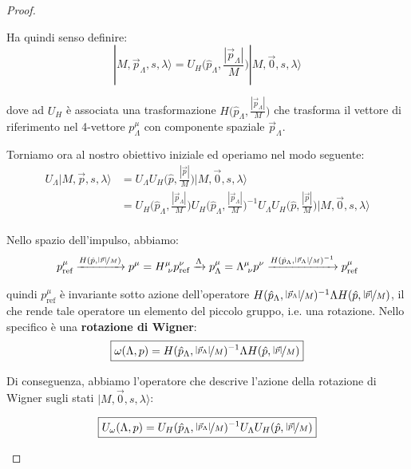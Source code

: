 \documentclass[../main.tex]{subfiles}
\begin{document}
\begin{proof}
\begin{itemize}
    Ha quindi senso definire: \[|M,\Vec{p}_\Lambda,s,\lambda\rangle = U_H\Big(\hat{p}_\Lambda, \frac{|\Vec{p}_\Lambda|}{M}\Big)|M,\Vec{0},s,\lambda\rangle\]

    dove ad $U_H$ è associata una trasformazione $H\big(\hat{p}_\Lambda, \frac{|\Vec{p}_\Lambda|}{M}\big)$ che trasforma il vettore di riferimento nel 4-vettore $p_\Lambda^\mu$ con componente spaziale $\Vec{p}_\Lambda$.

    Torniamo ora al nostro obiettivo iniziale ed operiamo nel modo seguente:
    \begin{align*}
        U_\Lambda|M,\Vec{p},s,\lambda\rangle &= U_\Lambda U_H\Big(\hat{p}, \frac{|\Vec{p}|}{M}\Big)|M,\Vec{0},s,\lambda\rangle \\
        &= U_H\Big(\hat{p}_\Lambda, \frac{|\Vec{p}_\Lambda|}{M}\Big)U_H\Big(\hat{p}_\Lambda, \frac{|\Vec{p}_\Lambda|}{M}\Big)^{-1}U_\Lambda U_H\Big(\hat{p}, \frac{|\Vec{p}|}{M}\Big)|M,\Vec{0},s,\lambda\rangle\\
    \end{align*}

    Nello spazio dell'impulso, abbiamo:
    \[
    p_\text{ref}^\mu \xrightarrow[]{H(\hat{p}, \nicefrac{|\Vec{p}|}{M})} p^\mu = H^\mu_{~\nu}p^\nu_\text{ref}
    \xrightarrow[]{\Lambda} p_\Lambda^\mu = \Lambda^\mu_{~\nu}p^\nu
    \xrightarrow[]{H(\hat{p}_\Lambda, \nicefrac{|\Vec{p}_\Lambda|}{M})^{-1}} p_\text{ref}^\mu
    \]

    quindi \(p_\text{ref}^\mu\) è invariante sotto azione dell'operatore \(H(\hat{p}_\Lambda, \nicefrac{|\Vec{p}_\Lambda|}{M})^{-1}\Lambda H(\hat{p}, \nicefrac{|\Vec{p}|}{M})\), il che rende tale operatore un elemento del piccolo gruppo, i.e. una rotazione. Nello specifico è una \textbf{rotazione di Wigner}:
    \begin{equation}
        \boxed{
        \omega(\Lambda, p) = H(\hat{p}_\Lambda, \nicefrac{|\Vec{p}_\Lambda|}{M})^{-1}\Lambda H(\hat{p}, \nicefrac{|\Vec{p}|}{M})
        }
        \label{eq:wigner_rotation}
    \end{equation}

    Di conseguenza, abbiamo l'operatore che descrive l'azione della rotazione di Wigner sugli stati $|M,\Vec{0},s,\lambda\rangle$:

    \begin{equation}
        \boxed{
        U_\omega(\Lambda, p) = U_H(\hat{p}_\Lambda, \nicefrac{|\Vec{p}_\Lambda|}{M})^{-1} U_\Lambda U_H(\hat{p}, \nicefrac{|\Vec{p}|}{M})
        }
        \label{eq:wigner_rotation_operator}
    \end{equation}


\end{itemize}
\end{proof}
\end{document}
